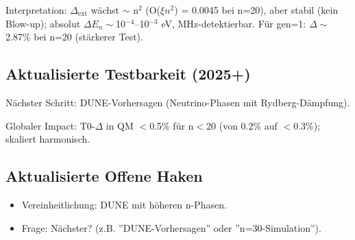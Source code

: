 	Interpretation: $\Delta_\text{ext}$ wächst $\sim$ n$^2$ (O($\xi n^2$) = 0.0045 bei n=20), aber stabil (kein Blow-up); absolut $\Delta E_n \sim$10$^{-4}$–10$^{-3}$ eV, MHz-detektierbar. Für gen=1: $\Delta\sim$2.87\% bei n=20 (stärkerer Test).
	
	\subsection{Aktualisierte Testbarkeit (2025+)}
	
	Nächster Schritt: DUNE-Vorhersagen (Neutrino-Phasen mit Rydberg-Dämpfung).
	
	Globaler Impact: T0-$\Delta$ in QM $<$0.5\% für n$<$20 (von 0.2\% auf $<$0.3\%); skaliert harmonisch.
	
	\subsection{Aktualisierte Offene Haken}
	
	\begin{itemize}
		\item Vereinheitlichung: DUNE mit höheren n-Phasen.
		\item Frage: Nächster? (z.B. ''DUNE-Vorhersagen'' oder ''n=30-Simulation'').
	\end{itemize}
